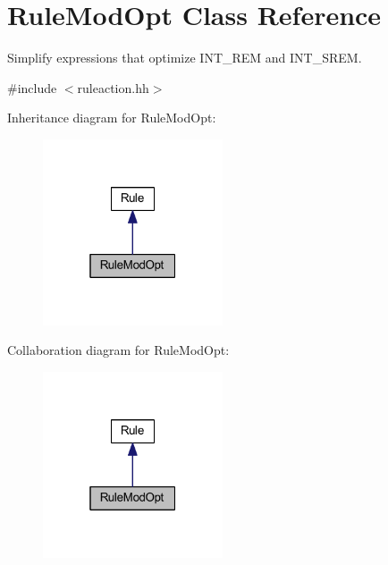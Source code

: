 \hypertarget{class_rule_mod_opt}{}\section{Rule\+Mod\+Opt Class Reference}
\label{class_rule_mod_opt}


Simplify expressions that optimize I\+N\+T\+\_\+\+R\+EM and I\+N\+T\+\_\+\+S\+R\+EM.  




{\ttfamily \#include $<$ruleaction.\+hh$>$}



Inheritance diagram for Rule\+Mod\+Opt\+:
\nopagebreak
\begin{figure}[H]
\begin{center}
\leavevmode
\includegraphics[width=151pt]{class_rule_mod_opt__inherit__graph}
\end{center}
\end{figure}


Collaboration diagram for Rule\+Mod\+Opt\+:
\nopagebreak
\begin{figure}[H]
\begin{center}
\leavevmode
\includegraphics[width=151pt]{class_rule_mod_opt__coll__graph}
\end{center}
\end{figure}
